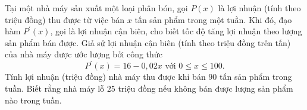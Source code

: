 \begin{ex}%
Tại một nhà máy sản xuất một loại phân bón, gọi $P(x)$ là lợi nhuận (tính theo triệu đồng) thu được từ việc bán $x$ tấn sản phẩm trong một tuần. Khi đó, đạo hàm $P^{\prime}(x)$, gọi là lợi nhuận cận biên, cho biết tốc độ tăng lợi nhuận theo lượng sản phẩm bán được. Giả sử lợi nhuận cận biên (tính theo triệu đồng trên tấn) của nhà máy được ước lượng bởi công thức
\[
P^{\prime}(x)=16-0{,}02 x \text { với } 0 \leq x \leq 100.
\]
Tính lợi nhuận (triệu đồng) nhà máy thu được khi bán $90$ tấn sản phẩm trong tuần. Biết rằng nhà máy lỗ $25$ triệu đồng nếu không bán được lượng sản phẩm nào trong tuần.
\end{ex}

